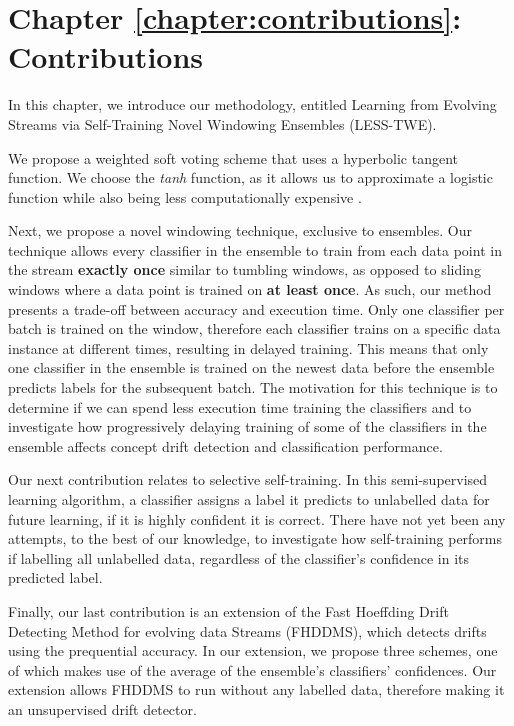\section{Chapter \ref{chapter:contributions}: Contributions}
In this chapter, we introduce our methodology, entitled Learning from Evolving Streams via Self-Training Novel Windowing Ensembles (LESS-TWE).

We propose a weighted soft voting scheme that uses a hyperbolic tangent function. We choose the \textit{tanh} function, as it allows us to approximate a logistic function while also being less computationally expensive \citep[10]{lecun2012efficient}.

Next, we propose a novel windowing technique, exclusive to ensembles. Our technique allows every classifier in the ensemble to train from each data point in the stream \textbf{exactly once} similar to tumbling windows, as opposed to sliding windows where a data point is trained on \textbf{at least once}. As such, our method presents a trade-off between accuracy and execution time. Only one classifier per batch is trained on the window, therefore each classifier trains on a specific data instance at different times, resulting in delayed training. This means that only one classifier in the ensemble is trained on the newest data before the ensemble predicts labels for the subsequent batch.
The motivation for this technique is to determine if we can spend less execution time training the classifiers and to investigate how progressively delaying training of some of the classifiers in the ensemble affects concept drift detection and classification performance.

Our next contribution relates to selective self-training. In this semi-supervised learning algorithm, a classifier assigns a label it predicts to unlabelled data for future learning, if it is highly confident it is correct. There have not yet been any attempts, to the best of our knowledge, to investigate how self-training performs if labelling all unlabelled data, regardless of the classifier's confidence in its predicted label.

Finally, our last contribution is an extension of the Fast Hoeffding Drift Detecting Method for evolving data Streams (FHDDMS), which detects drifts using the prequential accuracy. In our extension, we propose three schemes, one of which makes use of the average of the ensemble's classifiers' confidences. Our extension allows FHDDMS to run without any labelled data, therefore making it an unsupervised drift detector.

